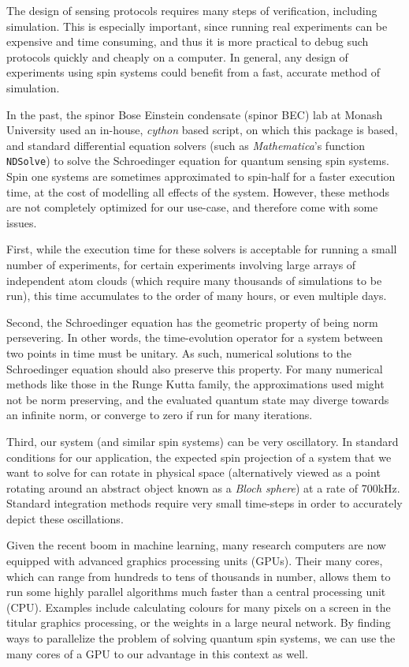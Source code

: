 \documentclass{jors}
\begin{document}
	The design of sensing protocols requires many steps of verification, including simulation.
	This is especially important, since running real experiments can be expensive and time consuming, and thus it is more practical to debug such protocols quickly and cheaply on a computer.
	In general, any design of experiments using spin systems could benefit from a fast, accurate method of simulation.

	In the past, the spinor Bose Einstein condensate (spinor BEC) lab at Monash University used an in-house, \emph{cython} based script, on which this package is based, and standard differential equation solvers (such as \emph{Mathematica}'s function \texttt{NDSolve}) to solve the Schroedinger equation for quantum sensing spin systems.
	Spin one systems are sometimes approximated to spin-half for a faster execution time, at the cost of modelling all effects of the system.
	However, these methods are not completely optimized for our use-case, and therefore come with some issues.

	First, while the execution time for these solvers is acceptable for running a small number of experiments, for certain experiments involving large arrays of independent atom clouds (which require many thousands of simulations to be run), this time accumulates to the order of many hours, or even multiple days.

	Second, the Schroedinger equation has the geometric property of being norm persevering.
	In other words, the time-evolution operator for a system between two points in time must be unitary.
	As such, numerical solutions to the Schroedinger equation should also preserve this property.
	For many numerical methods like those in the Runge Kutta family, the approximations used might not be norm preserving, and the evaluated quantum state may diverge towards an infinite norm, or converge to zero if run for many iterations.

	Third, our system (and similar spin systems) can be very oscillatory.
	In standard conditions for our application, the expected spin projection of a system that we want to solve for can rotate in physical space (alternatively viewed as a point rotating around an abstract object known as a \emph{Bloch sphere}) at a rate of 700kHz.
	Standard integration methods require very small time-steps in order to accurately depict these oscillations.

	Given the recent boom in machine learning, many research computers are now equipped with advanced graphics processing units (GPUs).
	Their many cores, which can range from hundreds to tens of thousands in number, allows them to run some highly parallel algorithms much faster than a central processing unit (CPU).
	Examples include calculating colours for many pixels on a screen in the titular graphics processing, or the weights in a large neural network.
	By finding ways to parallelize the problem of solving quantum spin systems, we can use the many cores of a GPU to our advantage in this context as well.
\end{document}
